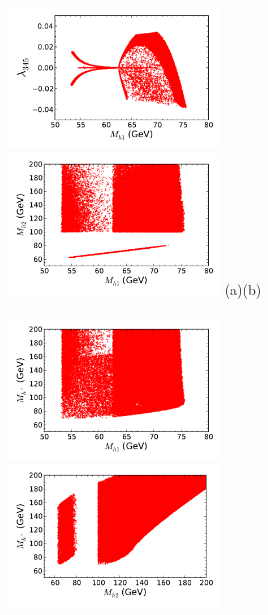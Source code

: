 \documentclass[12pt,a4paper]{article}
\begin{document}
%
\begin{figure}[htb]
\hspace*{-0.2cm}\includegraphics[width=0.50\textwidth]{Mh1_ld345_Omega_zoom-cut123456789_zz-monoc.pdf}%
\hspace*{-0.2cm}\includegraphics[width=0.50\textwidth]{Mh1_Mh2_Omega_zoom-cut123456789_zz-monoc.pdf}
\vskip -0.8cm
\hspace*{1cm}(a)\hspace*{0.55\textwidth}\hspace*{-1.5cm}(b)
\\
\\
\hspace*{-0.2cm}\includegraphics[width=0.50\textwidth]{Mh1_Mhc_Omega_zoom-cut123456789_zz-monoc.pdf}%
\hspace*{-0.2cm}\includegraphics[width=0.50\textwidth]{Mhc_Mh2_Omega_zoom-cut123456789_zz-monoc.pdf}

\end{figure}
\end{document}
